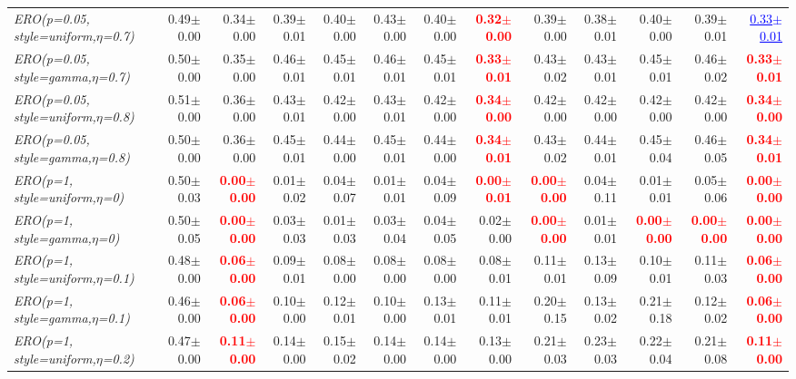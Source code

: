 \documentclass[nohyperref]{article}
\theoremstyle{plain}
\theoremstyle{definition}
\theoremstyle{remark}
\newcommand{\red}[1]{\textcolor{red}{\textbf{#1}}}
\newcommand{\blue}[1]{\textcolor{blue}{\underline{#1}}}
\begin{document}
\begin{table*}[!ht]
{\begin{tabular}{lrr|rrrrr|rrrrr}
			{\it ERO(p=0.05, style=uniform,$\eta$=0.7)} & 0.49$\pm$0.00 & 0.34$\pm$0.00 & 0.39$\pm$0.01 & 0.40$\pm$0.00 & 0.43$\pm$0.00 & 0.40$\pm$0.00 & \red{0.32$\pm$0.00} & 0.39$\pm$0.00 & 0.38$\pm$0.01 & 0.40$\pm$0.00 & 0.39$\pm$0.01 & \blue{0.33$\pm$0.01} \\
			{\it ERO(p=0.05, style=gamma,$\eta$=0.7)} & 0.50$\pm$0.00 & 0.35$\pm$0.00 & 0.46$\pm$0.01 & 0.45$\pm$0.01 & 0.46$\pm$0.01 & 0.45$\pm$0.01 & \red{0.33$\pm$0.01} & 0.43$\pm$0.02 & 0.43$\pm$0.01 & 0.45$\pm$0.01 & 0.46$\pm$0.02 & \red{0.33$\pm$0.01} \\
			{\it ERO(p=0.05, style=uniform,$\eta$=0.8)} & 0.51$\pm$0.00 & 0.36$\pm$0.00 & 0.43$\pm$0.01 & 0.42$\pm$0.00 & 0.43$\pm$0.01 & 0.42$\pm$0.00 & \red{0.34$\pm$0.00} & 0.42$\pm$0.00 & 0.42$\pm$0.00 & 0.42$\pm$0.00 & 0.42$\pm$0.00 & \red{0.34$\pm$0.00} \\
			{\it ERO(p=0.05, style=gamma,$\eta$=0.8)} & 0.50$\pm$0.00 & 0.36$\pm$0.00 & 0.45$\pm$0.01 & 0.44$\pm$0.00 & 0.45$\pm$0.01 & 0.44$\pm$0.00 & \red{0.34$\pm$0.01} & 0.43$\pm$0.02 & 0.44$\pm$0.01 & 0.45$\pm$0.04 & 0.46$\pm$0.05 & \red{0.34$\pm$0.01} \\
			{\it ERO(p=1, style=uniform,$\eta$=0)} & 0.50$\pm$0.03 & \red{0.00$\pm$0.00} & 0.01$\pm$0.02 & 0.04$\pm$0.07 & 0.01$\pm$0.01 & 0.04$\pm$0.09 & \red{0.00$\pm$0.01} & \red{0.00$\pm$0.00} & 0.04$\pm$0.11 & 0.01$\pm$0.01 & 0.05$\pm$0.06 & \red{0.00$\pm$0.00} \\
			{\it ERO(p=1, style=gamma,$\eta$=0)} & 0.50$\pm$0.05 & \red{0.00$\pm$0.00} & 0.03$\pm$0.03 & 0.01$\pm$0.03 & 0.03$\pm$0.04 & 0.04$\pm$0.05 & 0.02$\pm$0.00 & \red{0.00$\pm$0.00} & 0.01$\pm$0.01 & \red{0.00$\pm$0.00} & \red{0.00$\pm$0.00} & \red{0.00$\pm$0.00} \\
			{\it ERO(p=1, style=uniform,$\eta$=0.1)} & 0.48$\pm$0.00 & \red{0.06$\pm$0.00} & 0.09$\pm$0.01 & 0.08$\pm$0.00 & 0.08$\pm$0.00 & 0.08$\pm$0.00 & 0.08$\pm$0.01 & 0.11$\pm$0.01 & 0.13$\pm$0.09 & 0.10$\pm$0.01 & 0.11$\pm$0.03 & \red{0.06$\pm$0.00} \\
			{\it ERO(p=1, style=gamma,$\eta$=0.1)} & 0.46$\pm$0.00 & \red{0.06$\pm$0.00} & 0.10$\pm$0.00 & 0.12$\pm$0.01 & 0.10$\pm$0.00 & 0.13$\pm$0.01 & 0.11$\pm$0.01 & 0.20$\pm$0.15 & 0.13$\pm$0.02 & 0.21$\pm$0.18 & 0.12$\pm$0.02 & \red{0.06$\pm$0.00} \\
			{\it ERO(p=1, style=uniform,$\eta$=0.2)} & 0.47$\pm$0.00 & \red{0.11$\pm$0.00} & 0.14$\pm$0.00 & 0.15$\pm$0.02 & 0.14$\pm$0.00 & 0.14$\pm$0.00 & 0.13$\pm$0.00 & 0.21$\pm$0.03 & 0.23$\pm$0.03 & 0.22$\pm$0.04 & 0.21$\pm$0.08 & \red{0.11$\pm$0.00} \\

\end{tabular}}
\end{table*}
\end{document}

